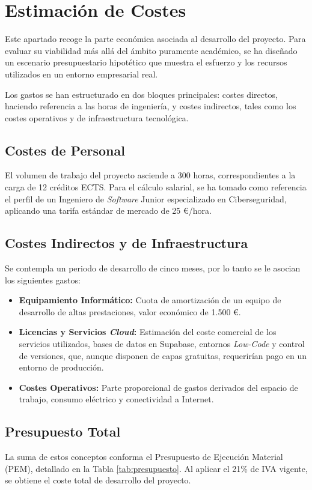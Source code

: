 \documentclass[11pt, a4paper]{report}
\theoremstyle{definition}
\begin{document}
\section{Estimación de Costes}

Este apartado recoge la parte económica asociada al desarrollo del proyecto. Para evaluar su viabilidad más allá del ámbito puramente académico, se ha diseñado un escenario presupuestario hipotético que muestra el esfuerzo y los recursos utilizados en un entorno empresarial real. 

Los gastos se han estructurado en dos bloques principales: costes directos, haciendo referencia a las horas de ingeniería, y costes indirectos, tales como los costes operativos y de infraestructura tecnológica.

\subsection{Costes de Personal}
El volumen de trabajo del proyecto asciende a 300 horas, correspondientes a la carga de 12 créditos ECTS. Para el cálculo salarial, se ha tomado como referencia el perfil de un Ingeniero de \textit{Software} Junior especializado en Ciberseguridad, aplicando una tarifa estándar de mercado de 25 \euro{}/hora.

\subsection{Costes Indirectos y de Infraestructura}
Se contempla un periodo de desarrollo de cinco meses, por lo tanto se le asocian los siguientes gastos:
\begin{itemize}
    \item \textbf{Equipamiento Informático:} Cuota de amortización de un equipo de desarrollo de altas prestaciones, valor económico de 1.500 \euro{}.
    \item \textbf{Licencias y Servicios \textit{Cloud}:} Estimación del coste comercial de los servicios utilizados, bases de datos en Supabase, entornos \textit{Low-Code} y control de versiones, que, aunque disponen de capas gratuitas, requerirían pago en un entorno de producción.
    \item \textbf{Costes Operativos:} Parte proporcional de gastos derivados del espacio de trabajo, consumo eléctrico y conectividad a Internet.
\end{itemize}

\subsection{Presupuesto Total}
La suma de estos conceptos conforma el Presupuesto de Ejecución Material (PEM), detallado en la Tabla \ref{tab:presupuesto}. Al aplicar el 21\% de IVA vigente, se obtiene el coste total de desarrollo del proyecto.
\end{document}
